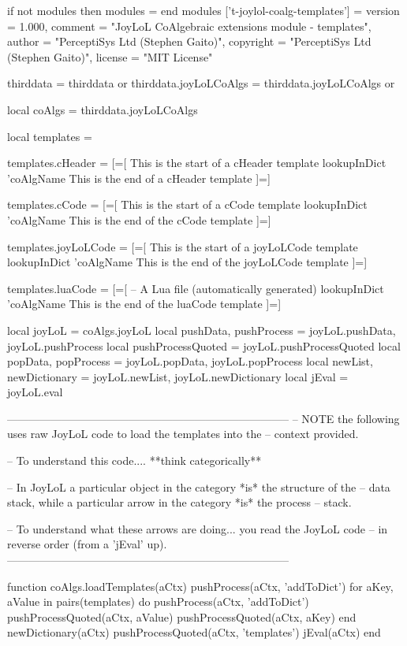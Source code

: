 \startLuaTemplate
if not modules then modules = { } end modules ['t-joylol-coalg-templates'] = {
    version   = 1.000,
    comment   = "JoyLoL CoAlgebraic extensions module - templates",
    author    = "PerceptiSys Ltd (Stephen Gaito)",
    copyright = "PerceptiSys Ltd (Stephen Gaito)",
    license   = "MIT License"
}

thirddata              = thirddata              or {}
thirddata.joyLoLCoAlgs = thirddata.joyLoLCoAlgs or {}

local coAlgs     = thirddata.joyLoLCoAlgs

local templates  = { }

templates.cHeader = [=[
This is the start of a cHeader template
{{ lookupInDict 'coAlgName }}
This is the end of a cHeader template
]=]

templates.cCode = [=[
This is the start of a cCode template
{{ lookupInDict 'coAlgName }}
This is the end of the cCode template
]=]

templates.joyLoLCode = [=[
This is the start of a joyLoLCode template
{{ lookupInDict 'coAlgName }}
This is the end of the joyLoLCode template
]=]

templates.luaCode = [=[
-- A Lua file (automatically generated)
{{ lookupInDict 'coAlgName }}
This is the end of the luaCode template
]=]

local joyLoL = coAlgs.joyLoL
local pushData, pushProcess = joyLoL.pushData, joyLoL.pushProcess
local pushProcessQuoted = joyLoL.pushProcessQuoted
local popData, popProcess   = joyLoL.popData, joyLoL.popProcess
local newList, newDictionary = joyLoL.newList, joyLoL.newDictionary
local jEval = joyLoL.eval

-----------------------------------------------------------------------------
-- NOTE the following uses raw JoyLoL code to load the templates into the 
-- context provided. 

-- To understand this code.... **think categorically**

-- In JoyLoL a particular object in the category *is* the structure of the 
-- data stack, while a particular arrow in the category *is* the process 
-- stack.

-- To understand what these arrows are doing... you read the JoyLoL code 
-- in reverse order (from a 'jEval' up). 
-----------------------------------------------------------------------------

function coAlgs.loadTemplates(aCtx)
  pushProcess(aCtx, 'addToDict')
  for aKey, aValue in pairs(templates) do
    pushProcess(aCtx, 'addToDict')
    pushProcessQuoted(aCtx, aValue)
    pushProcessQuoted(aCtx, aKey)
  end
  newDictionary(aCtx)
  pushProcessQuoted(aCtx, 'templates')
  jEval(aCtx)
end

